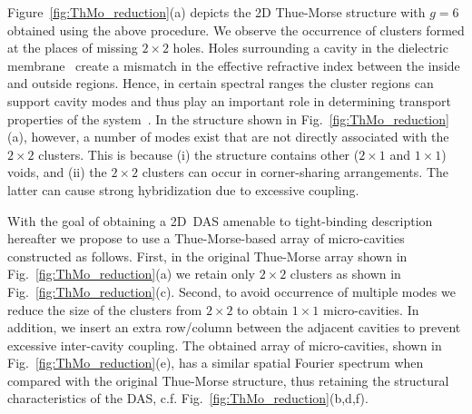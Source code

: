 Figure~\ref{fig:ThMo_reduction}(a) depicts the 2D Thue-Morse structure with $g=6$ obtained using the above procedure. We observe the occurrence of clusters formed at the places of missing $2\times2$ holes. Holes surrounding a cavity in the dielectric membrane~\cite{2011_Cao_DAS} create a mismatch in the effective refractive index between the inside and outside regions. Hence, in certain spectral ranges the cluster regions can support cavity modes and thus play an important role in determining transport properties of the system~\cite{2007_Moretti,2008_Boriskina,2011_Cao_DAS}. In the structure shown in Fig.~\ref{fig:ThMo_reduction}(a), however, a number of modes exist that are not directly associated with the $2\times2$ clusters. This is because (i) the structure contains other ($2\times 1$ and $1\times 1$) voids, and (ii) the $2\times 2$ clusters can occur in corner-sharing arrangements. The latter can cause strong hybridization due to excessive coupling.

With the goal of obtaining a 2D~DAS amenable to tight-binding description hereafter we propose to use a Thue-Morse-based array of micro-cavities constructed as follows. First, in the original Thue-Morse array shown in Fig.~\ref{fig:ThMo_reduction}(a) we retain only $2\times2$ clusters as shown in Fig.~\ref{fig:ThMo_reduction}(c). Second, to avoid occurrence of multiple modes we reduce the size of the clusters from $2\times2$ to obtain $1\times1$ micro-cavities. In addition, we insert an extra row/column between the adjacent cavities to prevent excessive inter-cavity coupling. The obtained array of micro-cavities, shown in Fig.~\ref{fig:ThMo_reduction}(e), has a similar spatial Fourier spectrum when compared with the original Thue-Morse structure, thus retaining the structural characteristics of the DAS, c.f. Fig.~\ref{fig:ThMo_reduction}(b,d,f). 

